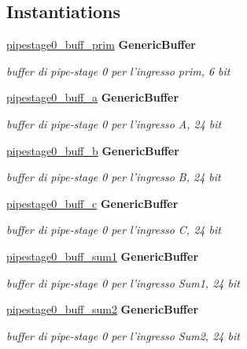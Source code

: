\subsection*{Instantiations}
 \begin{DoxyCompactItemize}
\item 
\hyperlink{class_linear_regression_1_1_structural_a18083ee6230f5eaa964e698d28b33c8e}{pipestage0\+\_\+buff\+\_\+prim}  {\bfseries Generic\+Buffer}   
\begin{DoxyCompactList}\small\item\em buffer di pipe-\/stage 0 per l'ingresso prim, 6 bit \end{DoxyCompactList}\item 
\hyperlink{class_linear_regression_1_1_structural_a2cc966f9e487a342b140941f0e08b0e3}{pipestage0\+\_\+buff\+\_\+a}  {\bfseries Generic\+Buffer}   
\begin{DoxyCompactList}\small\item\em buffer di pipe-\/stage 0 per l'ingresso A, 24 bit \end{DoxyCompactList}\item 
\hyperlink{class_linear_regression_1_1_structural_a9907462fa9f74221862307948f010a3f}{pipestage0\+\_\+buff\+\_\+b}  {\bfseries Generic\+Buffer}   
\begin{DoxyCompactList}\small\item\em buffer di pipe-\/stage 0 per l'ingresso B, 24 bit \end{DoxyCompactList}\item 
\hyperlink{class_linear_regression_1_1_structural_a2a2f46e1cff149263f8bdbf752ab030c}{pipestage0\+\_\+buff\+\_\+c}  {\bfseries Generic\+Buffer}   
\begin{DoxyCompactList}\small\item\em buffer di pipe-\/stage 0 per l'ingresso C, 24 bit \end{DoxyCompactList}\item 
\hyperlink{class_linear_regression_1_1_structural_a887437c4bb6b33e25dd4dda6a3a473d3}{pipestage0\+\_\+buff\+\_\+sum1}  {\bfseries Generic\+Buffer}   
\begin{DoxyCompactList}\small\item\em buffer di pipe-\/stage 0 per l'ingresso Sum1, 24 bit \end{DoxyCompactList}\item 
\hyperlink{class_linear_regression_1_1_structural_a0713cfc68348d42071bc61be0790d6f5}{pipestage0\+\_\+buff\+\_\+sum2}  {\bfseries Generic\+Buffer}   
\begin{DoxyCompactList}\small\item\em buffer di pipe-\/stage 0 per l'ingresso Sum2, 24 bit \end{DoxyCompactList}\item 

\end{DoxyCompactItemize}
